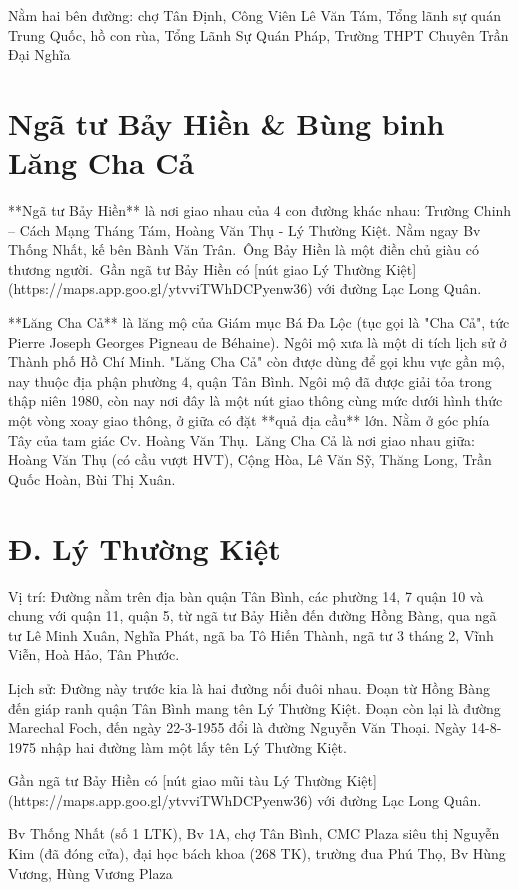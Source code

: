 Nằm hai bên đường: chợ Tân Định, Công Viên Lê Văn Tám, Tổng lãnh sự quán Trung Quốc, hồ con rùa, Tổng Lãnh Sự Quán Pháp, Trường THPT Chuyên Trần Đại Nghĩa

\section{Ngã tư Bảy Hiền \& Bùng binh Lăng Cha Cả}

**Ngã tư Bảy Hiền** là nơi giao nhau của 4 con đường khác nhau: Trường Chinh – Cách Mạng Tháng Tám, Hoàng Văn Thụ - Lý Thường Kiệt. Nằm ngay Bv Thống Nhất, kế bên Bành Văn Trân.\
Ông Bảy Hiền là một điền chủ giàu có thương người.\
Gần ngã tư Bảy Hiền có [nút giao Lý Thường Kiệt](https://maps.app.goo.gl/ytvviTWhDCPyenw36) với đường Lạc Long Quân.

**Lăng Cha Cả** là lăng mộ của Giám mục Bá Đa Lộc (tục gọi là "Cha Cả", tức Pierre Joseph Georges Pigneau de Béhaine). Ngôi mộ xưa là một di tích lịch sử ở Thành phố Hồ Chí Minh. "Lăng Cha Cả" còn được dùng để gọi khu vực gần mộ, nay thuộc địa phận phường 4, quận Tân Bình. Ngôi mộ đã được giải tỏa trong thập niên 1980, còn nay nơi đây là một nút giao thông cùng mức dưới hình thức một vòng xoay giao thông, ở giữa có đặt **quả địa cầu** lớn. Nằm ở góc phía Tây của tam giác Cv. Hoàng Văn Thụ.\
Lăng Cha Cả là nơi giao nhau giữa: Hoàng Văn Thụ (có cầu vượt HVT), Cộng Hòa, Lê Văn Sỹ, Thăng Long, Trần Quốc Hoàn, Bùi Thị Xuân.

\section{Đ. Lý Thường Kiệt}

Vị trí: Đường nằm trên địa bàn quận Tân Bình, các phường 14, 7 quận 10 và chung với quận 11, quận 5, từ ngã tư Bảy Hiền đến đường Hồng Bàng, qua ngã tư Lê Minh Xuân, Nghĩa Phát, ngã ba Tô Hiến Thành, ngã tư 3 tháng 2, Vĩnh Viễn, Hoà Hảo, Tân Phước.

Lịch sử: Đường này trước kia là hai đường nối đuôi nhau. Đoạn từ Hồng Bàng đến giáp ranh quận Tân Bình mang tên Lý Thường Kiệt. Đoạn còn lại là đường Marechal Foch, đến ngày 22-3-1955 đổi là đường Nguyễn Văn Thoại. Ngày 14-8-1975 nhập hai đường làm một lấy tên Lý Thường Kiệt.

Gần ngã tư Bảy Hiền có [nút giao mũi tàu Lý Thường Kiệt](https://maps.app.goo.gl/ytvviTWhDCPyenw36) với đường Lạc Long Quân.

Bv Thống Nhất (số 1 LTK), Bv 1A, chợ Tân Bình, CMC Plaza siêu thị Nguyễn Kim (đã đóng cửa), đại học bách khoa (268 TK), trường đua Phú Thọ, Bv Hùng Vương, Hùng Vương Plaza

